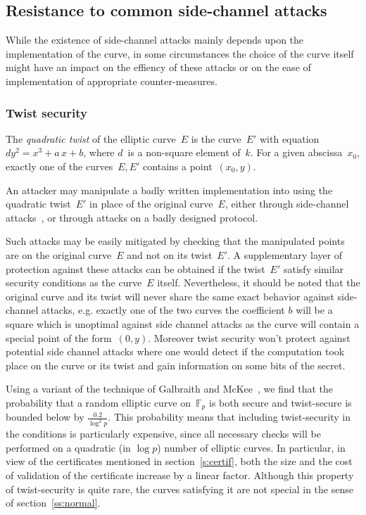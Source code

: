 \documentclass[twocolumn,letterpaper]{article}
\def\F{\mathbb{F}}
\begin{document}
\subsection{Resistance to common side-channel attacks}
\label{ss:side}

While the existence of side-channel attacks
mainly depends upon the implementation of the curve,
in some circumstances the choice of the curve itself
might have an impact on the effiency of these attacks
or on the ease of implementation of appropriate counter-measures.

\subsubsection{Twist security}
\label{sss:twist}

The \emph{quadratic twist} of the elliptic curve~$E$
is the curve~$E'$ with equation~$d y^2 = x^3 + a\,x + b$,
where $d$~is a non-square element of~$k$.
For a given abscissa~$x_0$,
exactly one of the curves~$E, E'$ contains a point~$(x_0, y)$.

An attacker may manipulate a badly written implementation
into using the quadratic twist~$E'$
in place of the original curve~$E$,
either through side-channel attacks~\cite{fdtc2008flrv},
or through attacks on a badly designed protocol.

Such attacks may be easily mitigated by checking
that the manipulated points are on the original curve~$E$
and not on its twist~$E'$.
A supplementary layer of protection against these attacks
can be obtained if the twist~$E'$ satisfy
similar security conditions as the curve~$E$ itself.
Nevertheless, it should be noted that the original curve and
its twist will never share the same exact behavior against
side-channel attacks, e.g. exactly one of the two curves the coefficient $b$
will be a square which is unoptimal against side channel attacks
as the curve will contain a special point of the form~$(0, y)$.
Moreover twist security won't protect against potential side channel attacks
where one would detect if the computation took place on the curve or its twist
and gain information on some bits of the secret.

Using a variant of the technique of Galbraith and McKee~\cite{lms2000gm},
we find that the probability that a random elliptic curve on~$\F_p$
is both secure and twist-secure
is bounded below by $\frac{0.2}{\log^2 p}$.
This probability means that
including twist-security in the conditions is particularly expensive,
since all necessary checks will be performed on
a quadratic (in $\log p$) number of elliptic curves.
In particular, in view of
the certificates mentioned in section~\ref{s:certif},
both the size and the cost of validation of the certificate
increase by a linear factor.
Although this property of twist-security is quite rare,
the curves satisfying it are not special
in the sense of section~\ref{ss:normal}.
\end{document}
